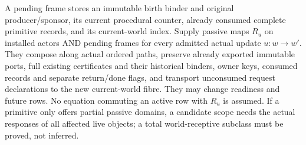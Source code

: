 \documentclass[11pt]{article}\usepackage{amsmath,amssymb,amsthm}
\begin{document}
A pending frame stores an immutable birth binder and original producer/sponsor, its current procedural counter, already consumed complete primitive records, and its current-world index. Supply passive maps $R_u$ on installed actors AND pending frames for every admitted actual update $u:w\to w'$. They compose along actual ordered paths, preserve already exported immutable ports, full existing certificates and their historical binders, owner keys, consumed records and separate return/done flags, and transport unconsumed request declarations to the new current-world fibre. They may change readiness and future rows. No equation commuting an active row with $R_u$ is assumed. If a primitive only offers partial passive domains, a candidate scope needs the actual responses of all affected live objects; a total world-receptive subclass must be proved, not inferred.
\end{document}
